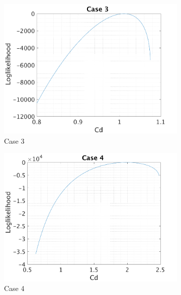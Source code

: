 \documentclass{article}
\begin{document}
\begin{figure}[H]
\begin{center}
   \begin{subfigure}{0.4\textwidth}
    \centering\includegraphics[width=1.1\textwidth,keepaspectratio]{images/inverse_problem/infer_drag/case3/cd_likelihood.png}
    \caption{\centering  Case 3}
  \end{subfigure}
 \begin{subfigure}{0.4\textwidth}
    \centering\includegraphics[width=1.1\textwidth,keepaspectratio]{images/inverse_problem/infer_drag/case4/cd_likelihood.png}
    \caption{\centering Case 4}
  \end{subfigure}
  \begin{subfigure}{0.4\textwidth}

\end{subfigure}
\end{center}
\end{figure}
\end{document}
